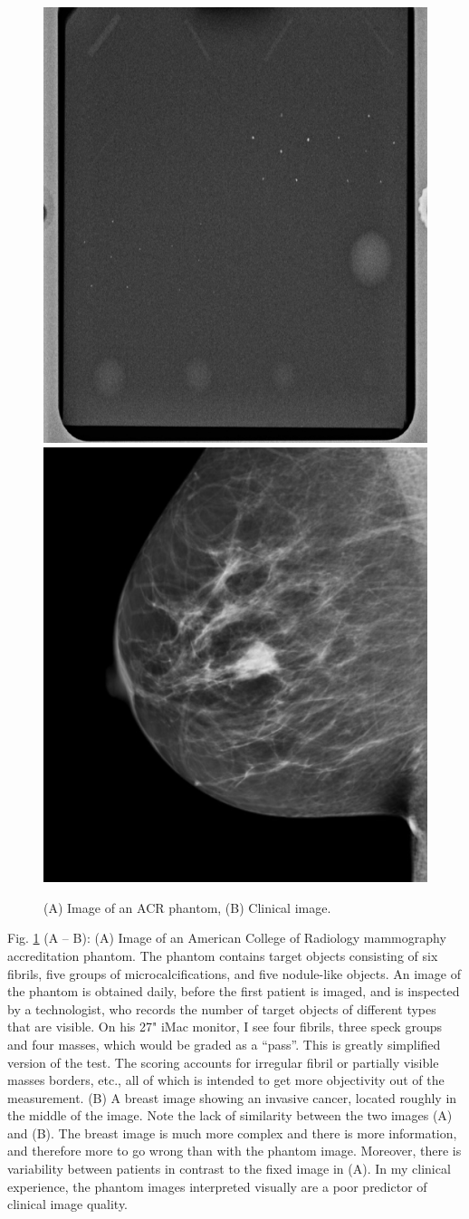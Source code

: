 \documentclass[
]{book}
\begin{document}
\begin{figure}
\includegraphics[width=0.5\linewidth]{images/AcrPhantom} \includegraphics[width=0.5\linewidth]{images/Clinical} \caption{(A) Image of an ACR phantom, (B) Clinical image.}\label{fig:acrPhantomClinical}
\end{figure}

Fig. \ref{fig:acrPhantomClinical} (A -- B): (A) Image of an American College of Radiology mammography accreditation phantom. The phantom contains target objects consisting of six fibrils, five groups of microcalcifications, and five nodule-like objects. An image of the phantom is obtained daily, before the first patient is imaged, and is inspected by a technologist, who records the number of target objects of different types that are visible. On his 27" iMac monitor, I see four fibrils, three speck groups and four masses, which would be graded as a ``pass''. This is greatly simplified version of the test. The scoring accounts for irregular fibril or partially visible masses borders, etc., all of which is intended to get more objectivity out of the measurement. (B) A breast image showing an invasive cancer, located roughly in the middle of the image. Note the lack of similarity between the two images (A) and (B). The breast image is much more complex and there is more information, and therefore more to go wrong than with the phantom image. Moreover, there is variability between patients in contrast to the fixed image in (A). In my clinical experience, the phantom images interpreted visually are a poor predictor of clinical image quality.
\end{document}
